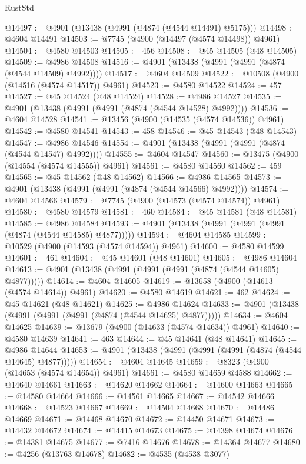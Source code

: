 \begin{lexlean}{RustStd}
\begin{coremodule}
@14497 := @4901 (@13438 (@4991 (@4874 (@4544 @14491) @5175)))
@14498 := @4604 @14491
@14503 := @7745 (@4900 (@14497 (@4574 @14498)) @4961)
@14504 := @4580 @14503
@14505 := 456
@14508 := @45 @14505 (@48 @14505)
@14509 := @4986 @14508
@14516 := @4901 (@13438 (@4991 (@4991 (@4874 (@4544 @14509) @4992))))
@14517 := @4604 @14509
@14522 := @10508 (@4900 (@14516 (@4574 @14517)) @4961)
@14523 := @4580 @14522
@14524 := 457
@14527 := @45 @14524 (@48 @14524)
@14528 := @4986 @14527
@14535 := @4901 (@13438 (@4991 (@4991 (@4874 (@4544 @14528) @4992))))
@14536 := @4604 @14528
@14541 := @13456 (@4900 (@14535 (@4574 @14536)) @4961)
@14542 := @4580 @14541
@14543 := 458
@14546 := @45 @14543 (@48 @14543)
@14547 := @4986 @14546
@14554 := @4901 (@13438 (@4991 (@4991 (@4874 (@4544 @14547) @4992))))
@14555 := @4604 @14547
@14560 := @13475 (@4900 (@14554 (@4574 @14555)) @4961)
@14561 := @4580 @14560
@14562 := 459
@14565 := @45 @14562 (@48 @14562)
@14566 := @4986 @14565
@14573 := @4901 (@13438 (@4991 (@4991 (@4874 (@4544 @14566) @4992))))
@14574 := @4604 @14566
@14579 := @7745 (@4900 (@14573 (@4574 @14574)) @4961)
@14580 := @4580 @14579
@14581 := 460
@14584 := @45 @14581 (@48 @14581)
@14585 := @4986 @14584
@14593 := @4901 (@13438 (@4991 (@4991 (@4991 (@4874 (@4544 @14585) @4877)))))
@14594 := @4604 @14585
@14599 := @10529 (@4900 (@14593 (@4574 @14594)) @4961)
@14600 := @4580 @14599
@14601 := 461
@14604 := @45 @14601 (@48 @14601)
@14605 := @4986 @14604
@14613 := @4901 (@13438 (@4991 (@4991 (@4991 (@4874 (@4544 @14605) @4877)))))
@14614 := @4604 @14605
@14619 := @13658 (@4900 (@14613 (@4574 @14614)) @4961)
@14620 := @4580 @14619
@14621 := 462
@14624 := @45 @14621 (@48 @14621)
@14625 := @4986 @14624
@14633 := @4901 (@13438 (@4991 (@4991 (@4991 (@4874 (@4544 @14625) @4877)))))
@14634 := @4604 @14625
@14639 := @13679 (@4900 (@14633 (@4574 @14634)) @4961)
@14640 := @4580 @14639
@14641 := 463
@14644 := @45 @14641 (@48 @14641)
@14645 := @4986 @14644
@14653 := @4901 (@13438 (@4991 (@4991 (@4991 (@4874 (@4544 @14645) @4877)))))
@14654 := @4604 @14645
@14659 := @8323 (@4900 (@14653 (@4574 @14654)) @4961)
@14661 := @4580 @14659 @4588
@14662 := @14640 @14661
@14663 := @14620 @14662
@14664 := @14600 @14663
@14665 := @14580 @14664
@14666 := @14561 @14665
@14667 := @14542 @14666
@14668 := @14523 @14667
@14669 := @14504 @14668
@14670 := @14486 @14669
@14671 := @14468 @14670
@14672 := @14450 @14671
@14673 := @14432 @14672
@14674 := @14415 @14673
@14675 := @14398 @14674
@14676 := @14381 @14675
@14677 := @7416 @14676
@14678 := @14364 @14677
@14680 := @4256 (@13763 @14678)
@14682 := @4535 (@4538 @3077)

\end{coremodule}
\end{lexlean}
